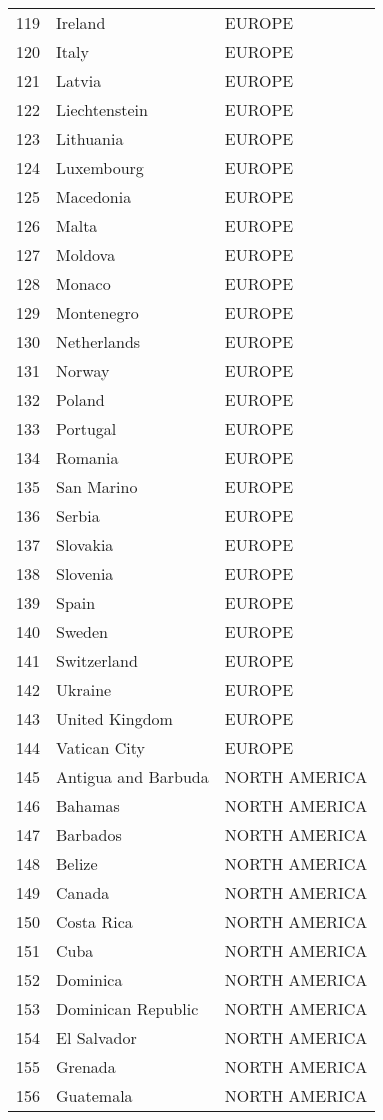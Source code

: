\documentclass[11pt]{article}
\begin{document}
\begin{center}
\begin{tabular}{rll}
119 & Ireland & EUROPE\\
120 & Italy & EUROPE\\
121 & Latvia & EUROPE\\
122 & Liechtenstein & EUROPE\\
123 & Lithuania & EUROPE\\
124 & Luxembourg & EUROPE\\
125 & Macedonia & EUROPE\\
126 & Malta & EUROPE\\
127 & Moldova & EUROPE\\
128 & Monaco & EUROPE\\
129 & Montenegro & EUROPE\\
130 & Netherlands & EUROPE\\
131 & Norway & EUROPE\\
132 & Poland & EUROPE\\
133 & Portugal & EUROPE\\
134 & Romania & EUROPE\\
135 & San Marino & EUROPE\\
136 & Serbia & EUROPE\\
137 & Slovakia & EUROPE\\
138 & Slovenia & EUROPE\\
139 & Spain & EUROPE\\
140 & Sweden & EUROPE\\
141 & Switzerland & EUROPE\\
142 & Ukraine & EUROPE\\
143 & United Kingdom & EUROPE\\
144 & Vatican City & EUROPE\\
145 & Antigua and Barbuda & NORTH AMERICA\\
146 & Bahamas & NORTH AMERICA\\
147 & Barbados & NORTH AMERICA\\
148 & Belize & NORTH AMERICA\\
149 & Canada & NORTH AMERICA\\
150 & Costa Rica & NORTH AMERICA\\
151 & Cuba & NORTH AMERICA\\
152 & Dominica & NORTH AMERICA\\
153 & Dominican Republic & NORTH AMERICA\\
154 & El Salvador & NORTH AMERICA\\
155 & Grenada & NORTH AMERICA\\
156 & Guatemala & NORTH AMERICA\\

\end{tabular}
\end{center}
\end{document}
